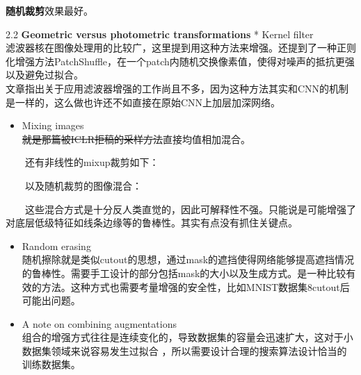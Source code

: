 \textbf{随机裁剪}效果最好。

2.2 \textbf{Geometric versus photometric transformations} * Kernel
filter\\
滤波器核在图像处理用的比较广，这里提到用这种方法来增强。还提到了一种正则化增强方法PatchShuffle，在一个patch内随机交换像素值，使得对噪声的抵抗更强以及避免过拟合。\\
文章指出关于应用滤波器增强的工作尚且不多，因为这种方法其实和CNN的机制是一样的，这么做也许还不如直接在原始CNN上加层加深网络。

\begin{itemize}
\item
  Mixing images\\
  \sout{就是那篇被ICLR拒稿的采样方法}直接均值相加混合。
\end{itemize}

\begin{figure}
\centering
\caption{}
\end{figure}

  还有非线性的mixup裁剪如下：

\begin{figure}
\centering
\caption{}
\end{figure}

  以及随机裁剪的图像混合：

\begin{figure}
\centering
\caption{}
\end{figure}

  这些混合方式是十分反人类直觉的，因此可解释性不强。只能说是可能增强了对底层低级特征如线条边缘等的鲁棒性。其实有点没有抓住关键点。

\begin{itemize}
\item
  Random erasing\\
  随机擦除就是类似cutout的思想，通过mask的遮挡使得网络能够提高遮挡情况的鲁棒性。需要手工设计的部分包括mask的大小以及生成方式。是一种比较有效的方法。这种方式也需要考量增强的安全性，比如MNIST数据集8cutout后可能出问题。
\end{itemize}

\begin{figure}
\centering
\caption{}
\end{figure}

\begin{itemize}
\item
  A note on combining augmentations\\
  组合的增强方式往往是连续变化的，导致数据集的容量会迅速扩大，这对于小数据集领域来说容易发生过拟合
  ，所以需要设计合理的搜索算法设计恰当的训练数据集。
\end{itemize}

